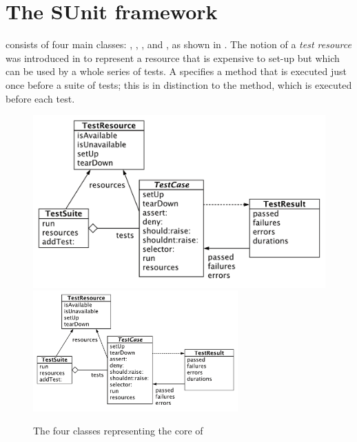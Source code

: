 \documentclass[a4paper,10pt,twoside]{book}
\begin{document}
\section{The SUnit framework}

\sunit consists of four main classes: ,
, , and , as shown in .
The notion of a \emph{test resource} was introduced in  to represent a resource that is expensive to set-up but which can be used by
a whole series of tests.  A 
specifies a  method that is executed just once before a suite of tests;
this is in distinction to the  method, which is executed before
each test.

\begin{figure}[htb]
  \begin{center}
  	\ifluluelse
		{\includegraphics[width=\textwidth]{sunit-classes}}
		{\includegraphics[width=0.7\textwidth]{sunit-classes}}
	\caption{The four classes representing the core of \SUnit}
	\label{fig:sunit-classes}
  \end{center}
\end{figure}


\end{document}
